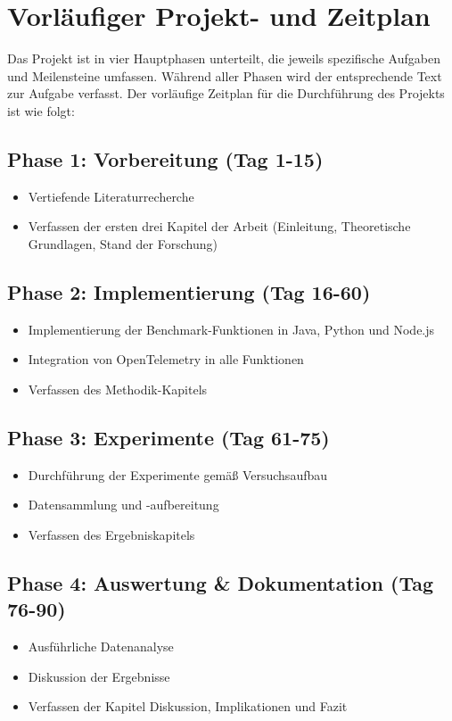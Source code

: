 \chapter{Vorläufiger Projekt- und Zeitplan}
\label{ch:chapter10}
Das Projekt ist in vier Hauptphasen unterteilt, die jeweils spezifische Aufgaben und Meilensteine umfassen. 
Während aller Phasen wird der entsprechende Text zur Aufgabe verfasst. Der vorläufige Zeitplan für die Durchführung des Projekts ist wie folgt:

\section{Phase 1: Vorbereitung (Tag 1-15)}
\begin{itemize}
    \item Vertiefende Literaturrecherche
    \item Verfassen der ersten drei Kapitel der Arbeit (Einleitung, Theoretische Grundlagen, Stand der Forschung)
\end{itemize}

\section{Phase 2: Implementierung (Tag 16-60)}
\begin{itemize}
    \item Implementierung der Benchmark-Funktionen in Java, Python und Node.js
    \item Integration von OpenTelemetry in alle Funktionen
    \item Verfassen des Methodik-Kapitels
\end{itemize}

\section{Phase 3: Experimente (Tag 61-75)}
\begin{itemize}
    \item Durchführung der Experimente gemäß Versuchsaufbau
    \item Datensammlung und -aufbereitung
    \item Verfassen des Ergebniskapitels
\end{itemize}

\section{Phase 4: Auswertung \& Dokumentation (Tag 76-90)}
\begin{itemize}
    \item Ausführliche Datenanalyse
    \item Diskussion der Ergebnisse
    \item Verfassen der Kapitel Diskussion, Implikationen und Fazit
\end{itemize}

